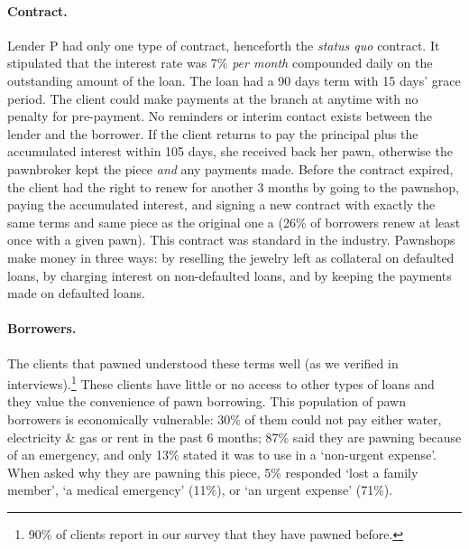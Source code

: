 \documentclass[oneside,11pt]{article}
\begin{document}
\paragraph{Contract.} Lender P had only one type of contract, henceforth the \textit{status quo} contract. It stipulated that the interest rate was 7\% \textit{per month} compounded daily on the outstanding amount of the loan. The loan had a 90 days term with 15 days' grace period. The client could make payments at the branch at anytime with no penalty for pre-payment. No reminders or interim contact exists between the lender and the borrower. If the client returns to pay the principal plus the accumulated interest within 105 days, she received back her pawn, otherwise the pawnbroker kept the piece \textit{and} any payments made. Before the contract expired, the client had the right to renew for another 3 months by going to the pawnshop, paying the accumulated interest, and signing a new contract with exactly the same terms and same piece as the original one a (26\% of borrowers renew at least once with a given pawn). This contract was standard in the industry.  Pawnshops make money in three ways: by reselling the jewelry left as collateral on defaulted loans, by charging interest on non-defaulted loans, and by keeping the payments made on defaulted loans. 

\paragraph{Borrowers.} The clients that pawned understood these terms well (as we verified in interviews).\footnote{90\% of clients report in our survey that they have pawned before.} These clients have little or no access to other types of loans and they value the convenience of pawn borrowing.  This population of pawn borrowers is economically vulnerable:  30\% of them could not pay either water, electricity \& gas or rent in the past 6 months; 87\% said they are pawning because of an emergency, and only 13\% stated it was to use in a `non-urgent expense'.  When asked why they are pawning this piece, 5\% responded `lost a family member', `a medical emergency' (11\%), or `an urgent expense' (71\%).
\end{document}

